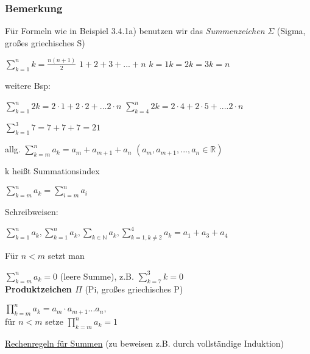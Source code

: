 \documentclass[a4paper, 12pt, twoside] {article}
\begin{document}
\subsubsection{Bemerkung} %
Für Formeln wie in Beispiel 3.4.1a) benutzen wir das \textit{Summenzeichen} $\Sigma$ (Sigma, großes griechisches S)

$\displaystyle\sum_{k = 1}^{n} k = \frac{n(n+1)}{2}$
$1 + 2 + 3 + ... +n$
$k = 1 k = 2 k = 3 k = n$ %

weitere Bsp:

$\sum_{k = 1}^{n} 2k = 2 \cdot 1 + 2 \cdot 2 + ... 2 \cdot n$
$\sum_{k=4}^{n} 2k = 2 \cdot 4 + 2 \cdot 5 + .... 2 \cdot n$

$\sum_{k=1}^{3} 7 = 7 + 7 + 7 = 21$ %

allg. $\sum_{k=m}^{n} a_k = a_m + a_{m+1} + a_n$
$(a_m, a_{m+1}, ... ,a_n \in \mathbb{R})$

k heißt Summationsindex

$\sum_{k=m}^{n} a_k = \sum_{i = m}^{n} a_i$

Schreibweisen:

$\displaystyle\sum_{k = 1}^{n} a_k, \sum_{k = 1}^{n} a_k, \sum_{k \in \mathbb{N}} a_k, \sum_{k=1, k \neq 2}^{4} a_k = a_1 + a_3 + a_4$

Für $n < m$ setzt man

$\sum_{k=m}^{n} a_k = 0$ (leere Summe), z.B. $\sum_{k=7}^{3} k = 0$ \\


\textbf{Produktzeichen $\Pi$} (Pi, großes griechisches P)

$\displaystyle\prod_{k=m}^{n} a_k = a_m  \cdot  a_{m+1} ... a_n,$ \\
für $n < m$ setze $\displaystyle\prod_{k=m}^{n} a_k = 1$

\underline{Rechenregeln für Summen} (zu beweisen z.B. durch vollständige Induktion)
\end{document}
